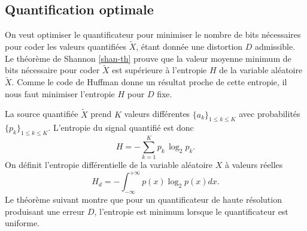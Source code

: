 \subsection{Quantification optimale}
On veut optimiser
le quantificateur pour minimiser le nombre de bits
n\'ecessaires pour coder les valeurs quantifi\'ees
$\tilde X$, \'etant donn\'ee une distortion $D$ admissible.
Le th\'eor\`eme de
Shannon \ref{shan-th} prouve que la valeur moyenne minimum de bits
n\'ecessaire pour coder $\tilde X$ est sup\'erieure \`a l'entropie $H$
de la variable al\'eatoire $\tilde X$.
Comme le
code de Huffman donne un r\'esultat proche de cette entropie,
il nous faut minimiser l'entropie $H$ pour $D$ fixe.

La source quantifi\'ee $\tilde X$ prend $K$ valeurs diff\'erentes
$\{a_k\}_{1 \leq k \leq K}$ avec probabilit\'es
$\{p_k\}_{1 \leq k \leq K}$.
L'entropie du signal quantifi\'e est donc
\[
H = - \sum_{k=1}^K p_k\, \log_2 p_k .
\]
On d\'efinit l'entropie diff\'erentielle de la variable al\'eatoire
$X$ \`a valeurs r\'eelles
\begin{equation}
\label{entropie-dffD}
H_d = - \int_{-\infty}^{+\infty} p(x) \log_2 p(x) dx .
\end{equation}
Le th\'eor\`eme suivant montre que pour un quantificateur de haute
r\'esolution produisant une erreur $D$,
l'entropie est minimum lorsque le quantificateur est
uniforme.

